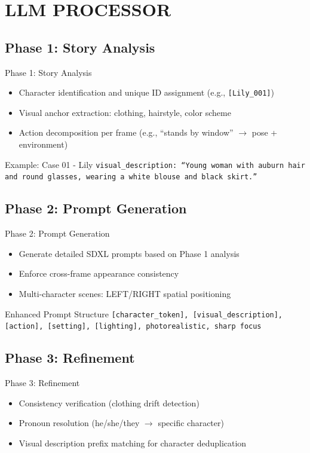 \documentclass{beamer}
\begin{document}
\section{LLM PROCESSOR}
\subsection{Phase 1: Story Analysis}
\begin{frame}{Phase 1: Story Analysis}
    \footnotesize
    \begin{itemize}
        \item Character identification and unique ID assignment (e.g., \texttt{[Lily\_001]})
        \item Visual anchor extraction: clothing, hairstyle, color scheme
        \item Action decomposition per frame (e.g., ``stands by window'' $\rightarrow$ pose + environment)
    \end{itemize}
    \begin{block}{Example: Case 01 - Lily}
        \footnotesize
        \texttt{visual\_description: ``Young woman with auburn hair and round glasses, wearing a white blouse and black skirt.''}
    \end{block}
\end{frame}

\subsection{Phase 2: Prompt Generation}
\begin{frame}{Phase 2: Prompt Generation}
    \footnotesize
    \begin{itemize}
        \item Generate detailed SDXL prompts based on Phase 1 analysis
        \item Enforce cross-frame appearance consistency
        \item Multi-character scenes: LEFT/RIGHT spatial positioning
    \end{itemize}
    \begin{block}{Enhanced Prompt Structure}
        \footnotesize
        \texttt{[character\_token], [visual\_description], [action], [setting], [lighting], photorealistic, sharp focus}
    \end{block}
\end{frame}

\subsection{Phase 3: Refinement}
\begin{frame}{Phase 3: Refinement}
    \footnotesize
    \begin{itemize}
        \item Consistency verification (clothing drift detection)
        \item Pronoun resolution (he/she/they $\rightarrow$ specific character)
        \item Visual description prefix matching for character deduplication
    \end{itemize}
\end{frame}
\end{document}
